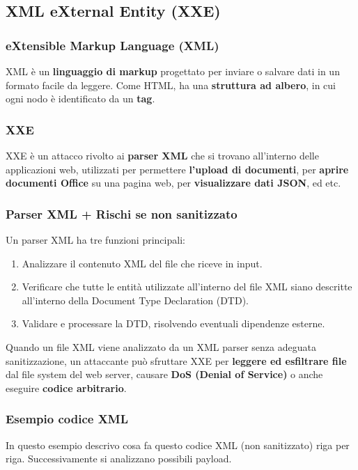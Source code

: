 \documentclass{article}
\begin{document}
\newpage
\subsection{XML eXternal Entity (XXE)}
\subsubsection{eXtensible Markup Language (XML)}
XML è un \textbf{linguaggio di markup} progettato per inviare o salvare dati in un formato facile da leggere. Come HTML, ha una \textbf{struttura ad albero}, in cui ogni nodo è identificato da un \textbf{tag}.

\subsubsection{XXE}
XXE è un attacco rivolto ai \textbf{parser XML} che si trovano all’interno delle applicazioni web, utilizzati per permettere \textbf{l’upload di documenti}, per \textbf{aprire documenti Office} su una pagina web, per \textbf{visualizzare dati JSON}, ed etc.


\subsubsection{Parser XML + Rischi se non sanitizzato}
Un parser XML ha tre funzioni principali:
\begin{enumerate}
	\item Analizzare il contenuto XML del file che riceve in input.
	
	\item Verificare che tutte le entità utilizzate all’interno del file XML siano descritte all’interno della Document Type Declaration (DTD).
	
	\item Validare e processare la DTD, risolvendo eventuali dipendenze esterne.
\end{enumerate}

Quando un file XML viene analizzato da un XML parser senza adeguata sanitizzazione, un attaccante può sfruttare XXE per \textbf{leggere ed esfiltrare file} dal file system del web server, causare \textbf{DoS (Denial of Service)} o anche eseguire \textbf{codice arbitrario}.

\subsubsection{Esempio codice XML}
In questo esempio descrivo cosa fa questo codice XML (non sanitizzato) riga per riga. Successivamente si analizzano possibili payload.
\end{document}
